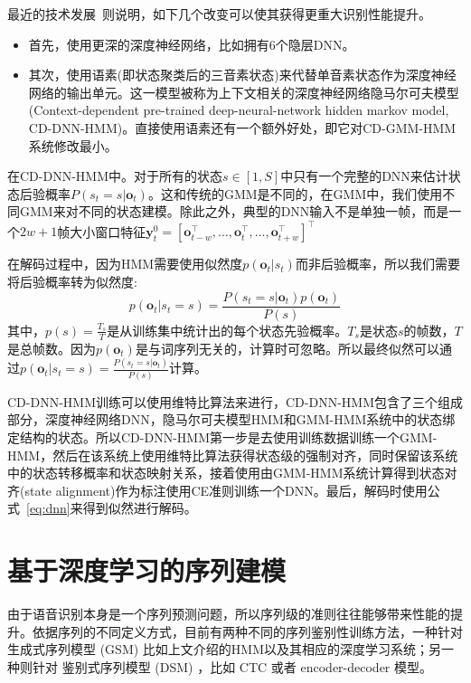 最近的技术发展~\cite{CD-DNN-HMM-dahl2012,DNN4ASR-hinton2012,seide2011conversational,yu2010roles}则说明，如下几个改变可以使其获得更重大识别性能提升。
\begin{itemize}
    \item 首先，使用更深的深度神经网络，比如拥有6个隐层DNN。
    \item 其次，使用语素(即状态聚类后的三音素状态)来代替单音素状态作为深度神经网络的输出单元。这一模型被称为上下文相关的深度神经网络隐马尔可夫模型(Context-dependent pre-trained deep-neural-network hidden markov model, CD-DNN-HMM)。直接使用语素还有一个额外好处，即它对CD-GMM-HMM系统修改最小。
\end{itemize}
在CD-DNN-HMM中。对于所有的状态$s \in [1,S]$中只有一个完整的DNN来估计状态后验概率$P(s_t=s|\mathbf{o}_t)$。这和传统的GMM是不同的，在GMM中，我们使用不同GMM来对不同的状态建模。除此之外，典型的DNN输入不是单独一帧，而是一个$2w+1$帧大小窗口特征$\mathbf{y}^0_t= [ \mathbf{o}_{t-w}^{\top}, \dots, \mathbf{o}^{\top}_t, \dots, \mathbf{o}^{\top}_{t+w} ]^{\top}$

在解码过程中，因为HMM需要使用似然度$p(\mathbf{o}_t|s_t)$而非后验概率，所以我们需要将后验概率转为似然度:
\begin{equation}
    \label{eq:dnn}
    p(\mathbf{o}_t|s_t=s) = \frac{P(s_t=s|\mathbf{o}_t)p(\mathbf{o}_t)}{P(s)}
\end{equation}
其中，$p(s)=\frac{T_s}{T}$是从训练集中统计出的每个状态先验概率。$T_s$是状态$s$的帧数，$T$是总帧数。因为$p(\mathbf{o}_t)$是与词序列无关的，计算时可忽略。所以最终似然可以通过$p(\mathbf{o}_t|s_t=s)=\frac{P(s_t=s|\mathbf{o}_t)}{P(s)}$计算。

CD-DNN-HMM训练可以使用维特比算法来进行，CD-DNN-HMM包含了三个组成部分，深度神经网络DNN，隐马尔可夫模型HMM和GMM-HMM系统中的状态绑定结构的状态。所以CD-DNN-HMM第一步是去使用训练数据训练一个GMM-HMM，然后在该系统上使用维特比算法获得状态级的强制对齐，同时保留该系统中的状态转移概率和状态映射关系，接着使用由GMM-HMM系统计算得到状态对齐(state alignment)作为标注使用CE准则训练一个DNN。最后，解码时使用公式~\ref{eq:dnn}来得到似然进行解码。



\section{基于深度学习的序列建模}
\label{Sec:seq-tr-review}

由于语音识别本身是一个序列预测问题，所以序列级的准则往往能够带来性能的提升。依据序列的不同定义方式，目前有两种不同的序列鉴别性训练方法，一种针对  生成式序列模型 (GSM) 比如上文介绍的HMM以及其相应的深度学习系统；另一种则针对 鉴别式序列模型 (DSM) ，比如 CTC 或者 encoder-decoder 模型。 

